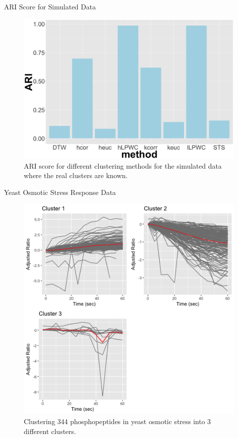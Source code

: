 \documentclass[10pt]{beamer}
\begin{document}
\begin{frame}{ARI Score for Simulated Data}
\begin{figure}
     \includegraphics[width=0.7\linewidth]{ARI-Impulse.png}
      \caption{ARI score for different clustering methods for the simulated data where the real clusters are known.}
       \label{fig:ariscore}
    \end{figure}

\end{frame}



\begin{frame}{Yeast Osmotic Stress Response Data}
\begin{figure}
     \includegraphics[width=0.65\linewidth]{yeast_cluster_lLPC.png}
      \caption{Clustering 344 phosphopeptides in yeast osmotic stress into 3 different clusters. }
       \label{fig:ariscore}
    \end{figure}

\end{frame}
\end{document}
